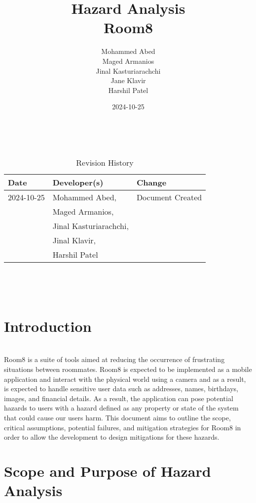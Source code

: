 \documentclass{article}
\title{Hazard Analysis\\Room8}
\author{Mohammed Abed \\ 
        Maged Armanios\\
        Jinal Kasturiarachchi\\
        Jane Klavir\\
        Harshil Patel\\}
\date{2024-10-25}
\begin{document}
\maketitle
\thispagestyle{empty}

~\newpage


\begin{table}[hp]
\caption{Revision History} \label{TblRevisionHistory}
\begin{tabularx}{\textwidth}{llX}
\toprule
\textbf{Date} & \textbf{Developer(s)} & \textbf{Change}\\
\midrule
2024-10-25 & Mohammed Abed, & Document Created\\
 & Maged Armanios, & \\
 & Jinal Kasturiarachchi, & \\
 & Jinal Klavir, & \\
 & Harshil Patel & \\
\bottomrule
\end{tabularx}
\end{table}

~\newpage

\tableofcontents

~\newpage



\section{Introduction}

\\
Room8 is a suite of tools aimed at reducing the occurrence of frustrating situations between roommates. Room8 is expected to be implemented as a mobile application and interact with the physical world using a camera and as a result, is expected to handle sensitive user data such as addresses, names, birthdays, images, and financial details. As a result, the application can pose potential hazards to users with a hazard defined as any property or state of the system that could cause our users harm. This document aims to outline the scope, critical assumptions, potential failures, and mitigation strategies for Room8 in order to allow the development to design mitigations for these hazards.


\section{Scope and Purpose of Hazard Analysis}
\end{document}
